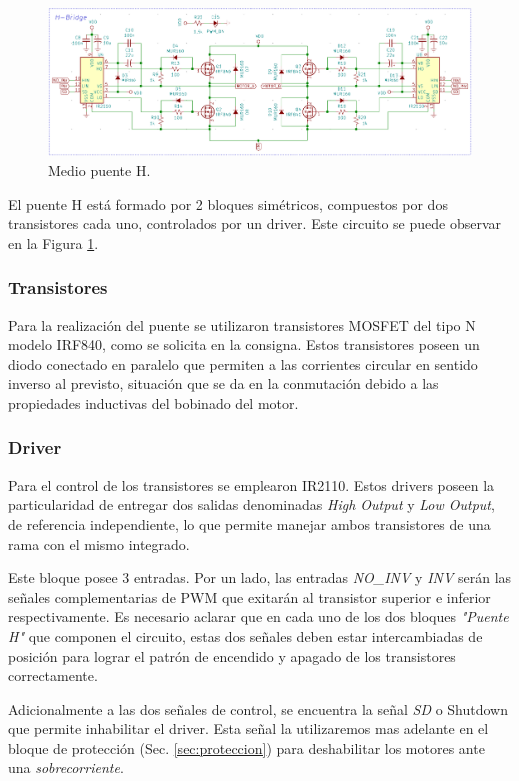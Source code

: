 \documentclass[11pt, a4paper]{article}
\begin{document}
\begin{figure}[h]
	\centering
	\includegraphics[width=\textwidth]{Imagenes/circ_driver.png}
	\caption{Medio puente H.}
	\label{fig:circ_driver}
\end{figure} 

El puente H está formado por 2 bloques simétricos, compuestos por dos transistores cada uno, controlados por un driver. Este circuito se puede observar en la Figura \ref{fig:circ_driver}.

\subsubsection{Transistores}

Para la realización del puente se utilizaron transistores MOSFET del tipo N modelo IRF840, como se solicita en la consigna. Estos transistores poseen un diodo conectado en paralelo que permiten a las corrientes circular en sentido inverso al previsto, situación que se da en la conmutación debido a las propiedades inductivas del bobinado del motor.

\subsubsection{Driver}
Para el control de los transistores se emplearon IR2110. Estos drivers poseen la particularidad de entregar dos salidas denominadas \textit{High Output} y \textit{Low Output}, de referencia independiente, lo que permite manejar ambos transistores de una rama con el mismo integrado.

Este bloque posee 3 entradas. Por un lado, las entradas \textit{NO\_INV} y \textit{INV} serán las señales complementarias de PWM que exitarán al transistor superior e inferior respectivamente. Es necesario aclarar que en cada uno de los dos bloques \textit{"Puente H"} que componen el circuito, estas dos señales deben estar intercambiadas de posición para lograr el patrón de encendido y apagado de los transistores correctamente.

Adicionalmente a las dos señales de control, se encuentra la señal \textit{SD} o Shutdown que permite inhabilitar el driver. Esta señal la utilizaremos mas adelante en el bloque de protección (Sec. \ref{sec:proteccion}) para deshabilitar los motores ante una \textit{sobrecorriente}.
\end{document}
